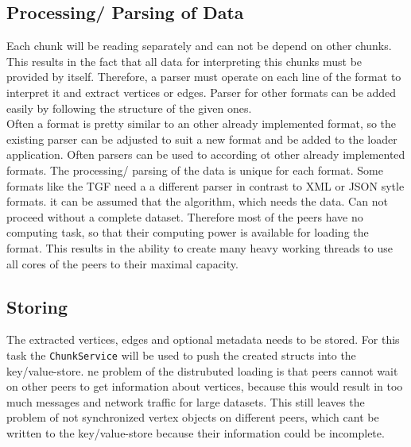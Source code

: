 \subsection{Processing/ Parsing of Data}
Each chunk will be reading separately and can not be depend on other chunks. This results in the fact that all data for interpreting this chunks must be provided by itself. Therefore, a parser must operate on each line of the format to interpret it and extract vertices or edges. Parser for other formats can be added easily by following the structure of the given ones.\\
Often a format is pretty similar to an other already implemented format, so the existing parser can be adjusted to suit a new format and be added to the loader application. Often parsers can be used to according ot other already implemented formats.
The processing/ parsing of the data is unique for each format. Some formats like the TGF need a a different parser in contrast to XML or JSON sytle formats. it can be assumed that the algorithm, which needs the data. Can not proceed without a complete dataset. Therefore most of the peers have no computing task, so that their computing power is available for loading the format. This results in the ability to create many heavy working threads to use all cores of the peers to their maximal capacity.

\subsection{Storing}
The extracted vertices, edges and optional metadata needs to be stored. For this task the \texttt{ChunkService} will be used to push the created structs into the key/value-store. ne problem of the distrubuted loading is that peers cannot wait on other peers to get information about vertices, because this would result in too much messages and network traffic for large datasets. This still leaves the problem of not synchronized vertex objects on different peers, which cant be written to the key/value-store because their information could be incomplete. 
